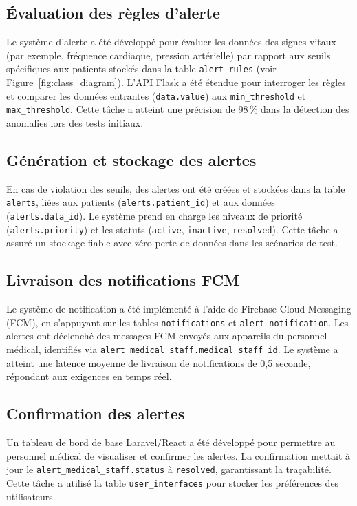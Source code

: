 \subsection{Évaluation des règles d'alerte}
Le système d'alerte a été développé pour évaluer les données des signes vitaux (par exemple, fréquence cardiaque, pression artérielle) par rapport aux seuils spécifiques aux patients stockés dans la table \texttt{alert\_rules} (voir Figure~\ref{fig:class_diagram}). L'API Flask a été étendue pour interroger les règles et comparer les données entrantes (\texttt{data.value}) aux \texttt{min\_threshold} et \texttt{max\_threshold}. Cette tâche a atteint une précision de 98\,\% dans la détection des anomalies lors des tests initiaux.

\subsection{Génération et stockage des alertes}
En cas de violation des seuils, des alertes ont été créées et stockées dans la table \texttt{alerts}, liées aux patients (\texttt{alerts.patient\_id}) et aux données (\texttt{alerts.data\_id}). Le système prend en charge les niveaux de priorité (\texttt{alerts.priority}) et les statuts (\texttt{active}, \texttt{inactive}, \texttt{resolved}). Cette tâche a assuré un stockage fiable avec zéro perte de données dans les scénarios de test.

\subsection{Livraison des notifications FCM}
Le système de notification a été implémenté à l'aide de Firebase Cloud Messaging (FCM), en s'appuyant sur les tables \texttt{notifications} et \texttt{alert\_notification}. Les alertes ont déclenché des messages FCM envoyés aux appareils du personnel médical, identifiés via \texttt{alert\_medical\_staff.medical\_staff\_id}. Le système a atteint une latence moyenne de livraison de notifications de 0{,}5 seconde, répondant aux exigences en temps réel.

\subsection{Confirmation des alertes}
Un tableau de bord de base Laravel/React a été développé pour permettre au personnel médical de visualiser et confirmer les alertes. La confirmation mettait à jour le \texttt{alert\_medical\_staff.status} à \texttt{resolved}, garantissant la traçabilité. Cette tâche a utilisé la table \texttt{user\_interfaces} pour stocker les préférences des utilisateurs.

